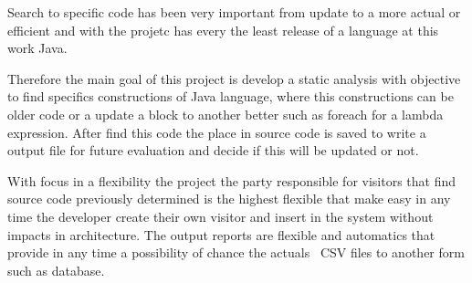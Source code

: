 Search to specific code has been very important from update to a more actual or efficient and with the projetc has every the least release of a language at this work Java.

Therefore the main goal of this project is develop a static analysis with objective to find specifics constructions of Java language, where this constructions can be older code or a update a block to another better such as foreach for a lambda expression. After find this code the place in source code is saved to write a output file for future evaluation and decide if this will be updated or not.

With focus in a flexibility the project the party responsible for visitors that find source code previously determined is the highest flexible that make easy in any time the developer create their own visitor and insert in the system without impacts in architecture. The output reports are flexible and automatics that provide in any time a possibility of chance the actuals ~\acs{CSV} files to another form such as database.


